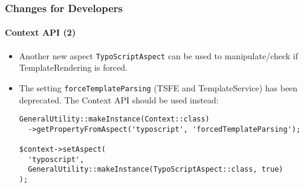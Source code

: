 
\begin{frame}[fragile]
	\frametitle{Changes for Developers}
	\framesubtitle{Context API (2)}

	\lstset{basicstyle=\tiny\ttfamily}

	\begin{itemize}

		\item Another new aspect \texttt{TypoScriptAspect} can be used to manipulate/check if
			TemplateRendering is forced.

		\item The setting \texttt{forceTemplateParsing} (TSFE and TemplateService) has been deprecated.
			The Context API should be used instead:

\begin{lstlisting}
GeneralUtility::makeInstance(Context::class)
  ->getPropertyFromAspect('typoscript', 'forcedTemplateParsing');

$context->setAspect(
  'typoscript',
  GeneralUtility::makeInstance(TypoScriptAspect::class, true)
);
\end{lstlisting}

	\end{itemize}

\end{frame}


